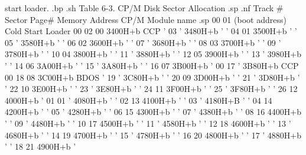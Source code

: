 start loader.
.bp
.sh
             Table 6-3.  CP/M Disk Sector Allocation
.sp
.nf
Track #    Sector   Page#   Memory Address    CP/M Module name
.sp
  00         01             (boot address)    Cold Start Loader
  00         02      00        3400H+b               CCP
  '          03      '         3480H+b                '
  '          04      01        3500H+b                '
  '          05      '         3580H+b                '
  '          06      02        3600H+b                '
  '          07      '         3680H+b                '
  '          08      03        3700H+b                '
  '          09      '         3780H+b                '
  '          10      04        3800H+b                '
  '          11      '         3880H+b                '
  '          12      05        3900H+b                '
  '          13      '         3980H+b                '
  '          14      06        3A00H+b                '
  '          15      '         3A80H+b                '
  '          16      07        3B00H+b                '
  00         17      '         3B80H+b               CCP
  00         18      08        3C00H+b              BDOS
  '          19      '         3C80H+b                '
  '          20      09        3D00H+b                '
  '          21      '         3D80H+b                '
  '          22      10        3E00H+b                '
  '          23      '         3E80H+b                '
  '          24      11        3F00H+b                '
  '          25      '         3F80H+b                '
  '          26      12        4000H+b                '
  01         01      '         4080H+b                '
  '          02      13        4100H+b                '
  '          03      '         4180H+B                '
  '          04      14        4200H+b                '
  '          05      '         4280H+b                '
  '          06      15        4300H+b                '
  '          07      '         4380H+b                '
  '          08      16        4400H+b                '
  '          09      '         4480H+b                '
  '          10      17        4500H+b                '
  '          11      '         4580H+b                '
  '          12      18        4600H+b                '
  '          13      '         4680H+b                '
  '          14      19        4700H+b                '
  '          15      '         4780H+b                '
  '          16      20        4800H+b                '
  '          17      '         4880H+b                '
  '          18      21        4900H+b                '
